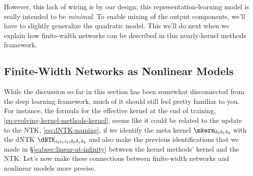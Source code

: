 However, this lack of wiring is by our design; this representation-learning model is really intended to be \emph{minimal}. To enable mixing of the output components, we'll have to slightly generalize the quadratic model. This we'll do next when we explain how finite-width networks can be described in this nearly-kernel methods framework.







\subsection{Finite-Width Networks as Nonlinear Models}\label{subsec:nonlinear-at-finite}
While the discussion so far in this section has been somewhat disconnected from the deep learning framework, much of it should still feel pretty familiar to you. For instance, the  formula for the effective kernel at the end of training, \eqref{eq:evolving-kernel-methods-kernel}, seems like it could be related to the update to the NTK, \eqref{eq:dNTK-naming}, if we identify the meta kernel $\mkerm_{\delta_0\delta_1\delta_2}$ with the dNTK $\dNTK_{i_0i_1i_2;\delta_0\delta_1\delta_2}$ and also make the previous identifications that we made in \S\ref{subsec:linear-at-infinity} between the kernel methods' kernel and the NTK. Let's now make these connections between finite-width networks and nonlinear models more precise.













